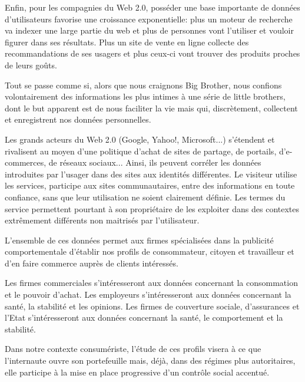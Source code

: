 {Enfin, pour les compagnies du Web 2.0, poss\'eder une base importante de
donn\'ees d'utilisateurs favorise une croissance exponentielle: plus un
moteur de recherche va indexer une large partie du web et plus de
personnes vont l'utiliser et vouloir figurer dans ses
r\'esultats. Plus un site de vente en ligne collecte des
recommandations de ses usagers et plus ceux{}-ci vont trouver des
produits proches de leurs go\^uts.

Tout se passe comme si, alors que nous craignons Big Brother, nous
confions volontairement des informations les plus intimes \`a une
s\'erie de little brothers, dont le but apparent est de nous faciliter
la vie mais qui, discr\`etement, collectent et enregistrent nos
donn\'ees personnelles.

Les grands acteurs du Web 2.0 (Google, Yahoo!, Microsoft...)
s'\'etendent et rivalisent au moyen
d'une politique d'achat de sites de
partage, de portails, d'e{}-commerces, de r\'eseaux
sociaux... Ainsi, ils peuvent corr\'eler les donn\'ees introduites par
l'usager dans des sites aux identit\'es diff\'erentes.
Le visiteur utilise les services, participe aux sites communautaires,
entre des informations en toute confiance, sans que leur utilisation ne
soient clairement d\'efinie. Les termes du service permettent pourtant
\`a son propri\'etaire de les exploiter dans des contextes
extr\^emement diff\'erents non maitris\'es par
l'utilisateur.

L'ensemble de ces donn\'ees permet aux firmes
sp\'ecialis\'ees dans la publicit\'e comportementale
d'\'etablir nos profils de consommateur, citoyen et
travailleur et d'en faire commerce aupr\`es de clients
int\'eress\'es.

Les firmes commerciales s'int\'eresseront aux donn\'ees
concernant la consommation et le pouvoir d'achat. Les
employeurs s'int\'eresseront aux donn\'ees concernant
la sant\'e, la stabilit\'e et les opinions. Les firmes de couverture
sociale, d'assurances et l'Etat
s'int\'eresseront aux donn\'ees concernant la sant\'e,
le comportement et la stabilit\'e.

Dans notre contexte consum\'eriste, l'\'etude de ces
profils visera \`a ce que l'internaute ouvre son
portefeuille mais, d\'ej\`a, dans des r\'egimes plus autoritaires, elle
participe \`a la mise en place progressive d'un
contr\^ole social accentu\'e.
\godown[2em]
\midaligned{}\par}
